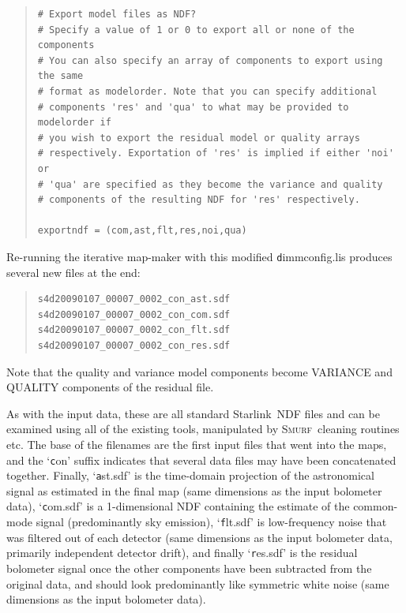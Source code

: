 \documentclass[twoside,11pt]{article}
\newenvironment{myquote}{\begin{quote}\begin{small}}{\end{small}\end{quote}}
\newcommand{\starlink}{\htmladdnormallink{Starlink}{http://star-www.rl.ac.uk/}}
\newcommand{\smurf}{\xref{\textsc{Smurf}}{sun258}{}}
\newcommand{\htmladdnormallink}[2]{#1}
\newcommand{\xref}[3]{#1}
\renewcommand{\_}{\texttt{\symbol{95}}}
\begin{document}
\begin{myquote}
\begin{verbatim}
# Export model files as NDF?
# Specify a value of 1 or 0 to export all or none of the components
# You can also specify an array of components to export using the same
# format as modelorder. Note that you can specify additional
# components 'res' and 'qua' to what may be provided to modelorder if
# you wish to export the residual model or quality arrays
# respectively. Exportation of 'res' is implied if either 'noi' or
# 'qua' are specified as they become the variance and quality
# components of the resulting NDF for 'res' respectively.

exportndf = (com,ast,flt,res,noi,qua)
\end{verbatim}
\end{myquote}

Re-running the iterative map-maker with this modified {\texttt
  dimmconfig.lis} produces several new files at the end:

\begin{myquote}
\begin{verbatim}
s4d20090107_00007_0002_con_ast.sdf
s4d20090107_00007_0002_con_com.sdf
s4d20090107_00007_0002_con_flt.sdf
s4d20090107_00007_0002_con_res.sdf
\end{verbatim}
\end{myquote}

Note that the quality and variance model components become VARIANCE
and QUALITY components of the residual file.

As with the input data, these are all standard \starlink\ NDF files
and can be examined using all of the existing tools, manipulated by
\smurf\ cleaning routines etc. The base of the filenames are the first
input files that went into the maps, and the `{\texttt con}' suffix
indicates that several data files may have been concatenated
together. Finally, `{\texttt *ast.sdf}' is the time-domain projection
of the astronomical signal as estimated in the final map (same
dimensions as the input bolometer data), `{\texttt *com.sdf}' is a
1-dimensional NDF containing the estimate of the common-mode signal
(predominantly sky emission), `{\texttt *flt.sdf}' is low-frequency
noise that was filtered out of each detector (same dimensions as the
input bolometer data, primarily independent detector drift), and
finally `{\texttt *res.sdf}' is the residual bolometer signal once the
other components have been subtracted from the original data, and
should look predominantly like symmetric white noise (same dimensions
as the input bolometer data).
\end{document}
